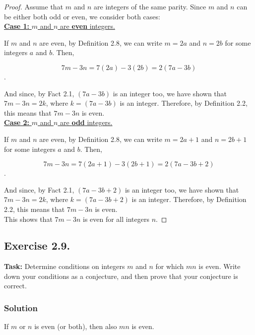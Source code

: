 \documentclass{article}
\begin{document}
\begin{proof}
    Assume that $m$ and $n$ are integers of the same parity. Since $m$ and $n$ can be either both odd or even, we consider both cases:\\

    \noindent \underline{\textbf{Case 1:} $m$ and $n$ are \textbf{even} integers.}

    \noindent If $m$ and $n$ are even, by Definition 2.8, we can write $m = 2a$ and $n=2b$ for some integers $a$ and $b$. Then,

    \[7m-3n=7(2a)-3(2b)=2(7a-3b)\].

    And since, by Fact 2.1, $(7a-3b)$ is an integer too, we have shown that $7m-3n=2k$, where $k=(7a-3b)$ is an integer. Therefore, by Definition 2.2, this means that $7m-3n$ is even.\\

    \noindent \underline{\textbf{Case 2:} $m$ and $n$ are \textbf{odd} integers.}

    \noindent If $m$ and $n$ are even, by Definition 2.8, we can write $m = 2a+1$ and $n=2b+1$ for some integers $a$ and $b$. Then,

    \[7m-3n=7(2a+1)-3(2b+1)=2(7a-3b+2)\].

    And since, by Fact 2.1, $(7a-3b+2)$ is an integer too, we have shown that $7m-3n=2k$, where $k=(7a-3b+2)$ is an integer. Therefore, by Definition 2.2, this means that $7m-3n$ is even.\\

    This shows that $7m-3n$ is even for all integers $n$.
\end{proof}

\subsection{Exercise 2.9.}
\textbf{Task:} Determine conditions on integers $m$ and $n$ for which $mn$ is even. Write down your conditions as a conjecture, and then prove that your conjecture is correct.

\subsubsection*{Solution}

\begin{conjecture}{}
    If $m$ or $n$ is even (or both), then also $mn$ is even.
\end{conjecture}
\end{document}
